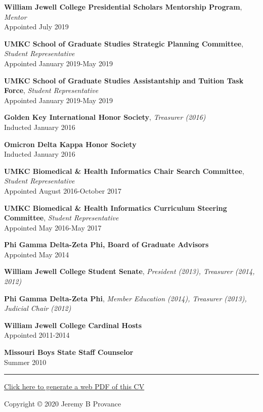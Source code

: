 \documentclass[
]{article}
\begin{document}
\textbf{William Jewell College Presidential Scholars Mentorship
Program}, \emph{Mentor}\\
Appointed July 2019

\textbf{UMKC School of Graduate Studies Strategic Planning Committee},
\emph{Student Representative}\\
Appointed January 2019-May 2019

\textbf{UMKC School of Graduate Studies Assistantship and Tuition Task
Force}, \emph{Student Representative}\\
Appointed January 2019-May 2019

\textbf{Golden Key International Honor Society}, \emph{Treasurer
(2016)}\\
Inducted January 2016

\textbf{Omicron Delta Kappa Honor Society}\\
Inducted January 2016

\textbf{UMKC Biomedical \& Health Informatics Chair Search Committee},
\emph{Student Representative}\\
Appointed August 2016-October 2017

\textbf{UMKC Biomedical \& Health Informatics Curriculum Steering
Committee}, \emph{Student Representative}\\
Appointed May 2016-May 2017

\textbf{Phi Gamma Delta-Zeta Phi, Board of Graduate Advisors}\\
Appointed May 2014

\textbf{William Jewell College Student Senate}, \emph{President (2013),
Treasurer (2014, 2012)}

\textbf{Phi Gamma Delta-Zeta Phi}, \emph{Member Education (2014),
Treasurer (2013), Judicial Chair (2012)}

\textbf{William Jewell College Cardinal Hosts}\\
Appointed 2011-2014

\textbf{Missouri Boys State Staff Counselor}\\
Summer 2010

\begin{center}\rule{0.5\linewidth}{0.5pt}\end{center}

\href{https://jeremyprovance.github.io/cv/index.pdf}{Click here to
generate a web PDF of this CV}

Copyright © 2020 Jeremy B Provance
\end{document}
